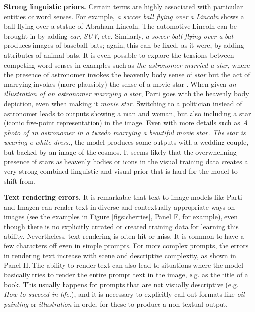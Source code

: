 \textbf{Strong linguistic priors.} Certain terms are highly associated with particular entities or word senses. For example, \textit{a soccer ball flying over a Lincoln} shows a ball flying over a statue of Abraham Lincoln. The automotive Lincoln can be brought in by adding \textit{car}, \textit{SUV}, etc. Similarly, \textit{a soccer ball flying over a bat} produces images of baseball bats; again, this can be fixed, as it were, by adding attributes of animal bats. It is even possible to explore the tensions between competing word senses in examples such as \textit{the astronomer married a star}, where the presence of astronomer invokes the heavenly body sense of \textit{star} but the act of marrying invokes (more plausibly) the sense of a movie star \cite{erk-herbelot-2021-marry}. When given \textit{an illustration of an astronomer marrying a star}, Parti goes with the heavenly body depiction, even when making it \textit{movie star}. Switching to a politician instead of astronomer leads to outputs showing a man and woman, but also including a star (iconic five-point representation) in the image. Even with more details such as \textit{A photo of an astronomer in a tuxedo marrying a beautiful movie star. The star is wearing a white dress.}, the model produces some outputs with a wedding couple, but backed by an image of the cosmos. It seems likely that the overwhelming presence of stars as heavenly bodies or icons in the visual training data creates a very strong combined linguistic and visual prior that is hard for the model to shift from. 

\textbf{Text rendering errors.} It is remarkable that text-to-image models like Parti and Imagen can render text in diverse and contextually appropriate ways on images (see the examples in Figure \ref{figs:cherries}, Panel F, for example), even though there is no explicitly curated or created training data for learning this ability. Nevertheless, text rendering is often hit-or-miss. It is common to have a few characters off even in simple prompts. For more complex prompts, the errors in rendering text increase with scene and descriptive complexity, as shown in Panel H. The ability to render text can also lead to situations where the model basically tries to render the entire prompt text in the image, e.g. as the title of a book. This usually happens for prompts that are not visually descriptive (e.g. \textit{How to succeed in life.}), and it is necessary to explicitly call out formats like \textit{oil painting} or \textit{illustration} in order for these to produce a non-textual output.


